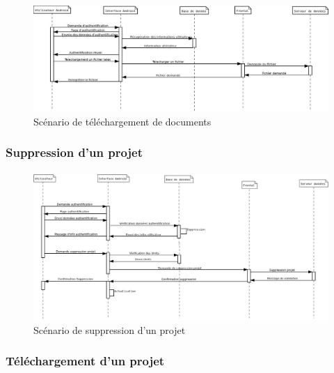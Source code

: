 \documentclass[a4paper,12pt]{article}
\begin{document}
\paragraph{}
\begin{figure}[!ht]
\begin{center}
  \includegraphics[width=1\textwidth, angle=90]{./Diagramme/Android/FichierLatexTelechargement.jpg}
\end{center}
  \caption{Scénario de téléchargement de documents}
  \label{androidDownload}
\end{figure}

\newpage
\subsubsection{Suppression d'un projet}
\paragraph{}
\begin{figure}[!ht]
\begin{center}
\includegraphics[width=1\textwidth,angle=90]{
./Diagramme/Android/SuppressionProjetViaAndroid.jpg}
\end{center}
  \caption{Scénario de suppression d'un projet}
  \label{androidDel}
\end{figure}

\newpage
\subsubsection{Téléchargement d'un projet}
\end{document}
